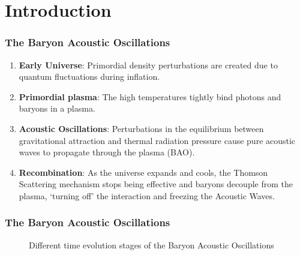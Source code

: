 \documentclass{beamer}
\begin{document}
\section{Introduction}
\begin{frame}[allowframebreaks]
\frametitle{The Baryon Acoustic Oscillations}

\begin{enumerate}
  \item \textbf{Early Universe}: Primordial density perturbations are created due to quantum fluctuations during inflation.
  
  \item \textbf{Primordial plasma}: The high temperatures tightly bind photons and baryons in a plasma.
  
  \item \textbf{Acoustic Oscillations}: Perturbations in the equilibrium between gravitational attraction and thermal radiation pressure cause pure acoustic waves to propagate through the plasma (BAO).
  
  \item \textbf{Recombination}: As the universe expands and cools, the Thomson Scattering mechanism stops being effective and baryons decouple from the plasma, `turning off' the interaction and freezing the Acoustic Waves.
  
  
\end{enumerate}

\end{frame}
\begin{frame}[allowframebreaks]
\frametitle{The Baryon Acoustic Oscillations}
\begin{figure}[b]
	\centering
	\caption{Different time evolution stages of the Baryon Acoustic Oscillations}
\end{figure}

\end{frame}
\end{document}
